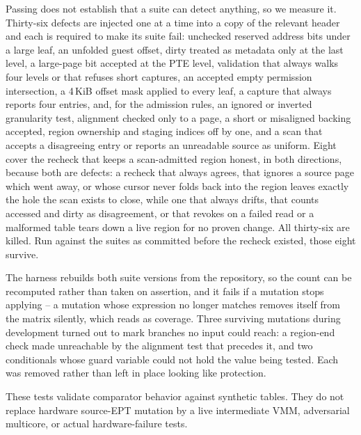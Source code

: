 Passing does not establish that a suite can detect anything, so we measure it.
Thirty-six defects are injected one at a time into a copy of the relevant
header and each is required to make its suite fail: unchecked reserved address
bits under a large leaf, an unfolded guest offset, dirty treated as metadata only
at the last level, a large-page bit accepted at the PTE level, validation that
always walks four levels or that refuses short captures, an accepted empty
permission intersection, a 4\,KiB offset mask applied to every leaf, a capture
that always reports four entries, and, for the admission rules, an ignored or
inverted granularity test, alignment checked only to a page, a short or
misaligned backing accepted, region ownership and staging indices off by one, and
a scan that accepts a disagreeing entry or reports an unreadable source as
uniform. Eight cover the recheck that keeps a scan-admitted region honest, in
both directions, because both are defects: a recheck that always agrees, that
ignores a source page which went away, or whose cursor never folds back into the
region leaves exactly the hole the scan exists to close, while one that always
drifts, that counts accessed and dirty as disagreement, or that revokes on a
failed read or a malformed table tears down a live region for no proven change.
All thirty-six are killed. Run against the suites as committed before the
recheck existed, those eight survive.

The harness rebuilds both suite versions from the repository, so the count can be
recomputed rather than taken on assertion, and it fails if a mutation stops
applying -- a mutation whose expression no longer matches removes itself from the
matrix silently, which reads as coverage. Three surviving mutations during
development turned out to mark branches no input could reach: a region-end check
made unreachable by the alignment test that precedes it, and two conditionals
whose guard variable could not hold the value being tested. Each was removed
rather than left in place looking like protection.

These tests validate comparator behavior against synthetic tables. They do not
replace hardware source-EPT mutation by a live intermediate VMM, adversarial
multicore, or actual hardware-failure tests.

